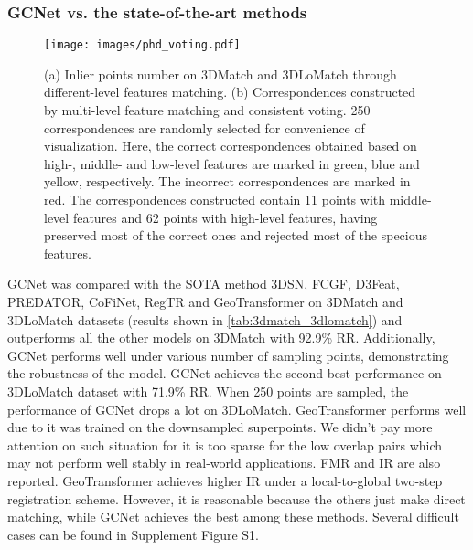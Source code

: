 \documentclass[10pt,twocolumn,letterpaper]{article}
\begin{document}
\subsubsection{GCNet vs. the state-of-the-art methods}\vspace{-.5em}



\begin{figure*}[!t]
\centering
\centerline{\texttt{[image: images/phd\_voting.pdf]}}
\vspace{-1em}
\caption{
(a) Inlier points number on 3DMatch and 3DLoMatch through different-level features matching. (b) Correspondences constructed by multi-level feature matching and consistent voting.
250 correspondences are randomly selected for convenience of visualization. Here, the correct correspondences obtained based on high-, middle- and low-level features are marked in green, blue and yellow, respectively. The incorrect correspondences are marked in red. 
The correspondences constructed contain 11 points with middle-level features and 62 points with high-level features, having preserved most of the correct ones and rejected most of the specious features.}
\vspace{-1.75em}
\label{fig:phd-voting}
\end{figure*}

GCNet was compared with the SOTA method 3DSN\cite{gojcic2019perfect}, FCGF\cite{choy2019fully}, D3Feat\cite{bai2020d3feat}, PREDATOR\cite{huang2021predator}, CoFiNet\cite{yu2021cofinet}, RegTR\cite{yew2022regtr} and GeoTransformer\cite{qin2022geometric} on 3DMatch and 3DLoMatch datasets (results shown in \cref{tab:3dmatch_3dlomatch}) and outperforms all the other models on 3DMatch with 92.9\% RR.
Additionally, GCNet performs well under various number of sampling points, demonstrating the robustness of the model. GCNet achieves the second best performance on 3DLoMatch dataset with 71.9\% RR. When 250 points are sampled, the performance of GCNet drops a lot on 3DLoMatch. GeoTransformer performs well due to it was trained on the downsampled superpoints. We didn't pay more attention on such situation for it is too sparse for the low overlap pairs which may not perform well stably in real-world applications. FMR and IR are also reported. GeoTransformer achieves higher IR under a local-to-global two-step registration scheme. However, it is reasonable because the others just make direct matching, while GCNet achieves the best among these methods.   
Several difficult cases can be found in Supplement Figure S1. 
\end{document}
